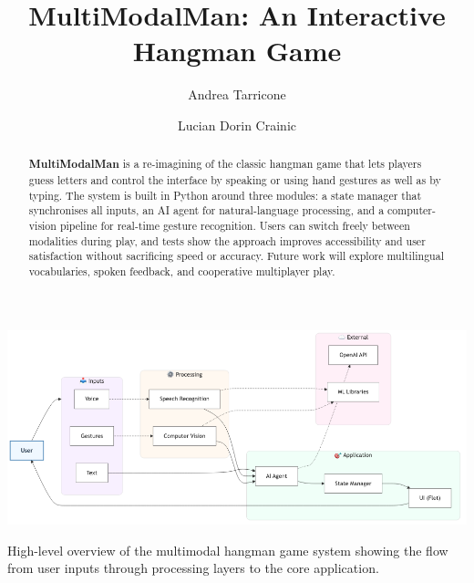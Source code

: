 \documentclass[nonacm,sigplan]{acmart}
\begin{document}
\title[]{MultiModalMan: An Interactive Hangman Game}

\author{Andrea Tarricone}

\author{Lucian Dorin Crainic}

\begin{abstract}
\textbf{MultiModalMan} is a re-imagining of the classic hangman game that lets players guess letters and control the interface by speaking or using hand gestures as well as by typing. The system is built in Python around three modules: a state manager that synchronises all inputs, an AI agent for natural-language processing, and a computer-vision pipeline for real-time gesture recognition. Users can switch freely between modalities during play, and tests show the approach improves accessibility and user satisfaction without sacrificing speed or accuracy. Future work will explore multilingual vocabularies, spoken feedback, and cooperative multiplayer play.
\end{abstract}


\begin{teaserfigure}
  \includegraphics[width=\textwidth]{./images/architecture_diagram.png}
  \caption{High-level overview of the multimodal hangman game system showing the flow from user inputs through processing layers to the core application.}
  \label{fig:teaser}
\end{teaserfigure}

\maketitle
\pagestyle{plain}




% 
% 
% 
% 
% 



\end{document}
